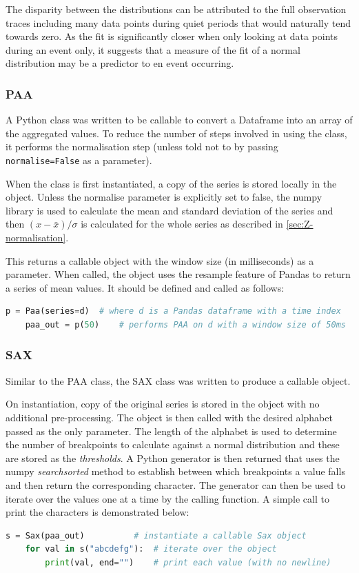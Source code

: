 \documentclass[../report.tex]{subfiles}
\begin{document}
	The disparity between the distributions can be attributed to the full observation traces including many data points during quiet periods that would naturally tend towards zero.  As the fit is significantly closer when only looking at data points during an event only, it suggests that a measure of the fit of a normal distribution may be a predictor to en event occurring.

\subsubsection{PAA}
	A Python class was written to be callable to convert a Dataframe into an array of the aggregated values.  To reduce the number of steps involved in using the class, it performs the normalisation step (unless told not to by passing \verb|normalise=False| as a parameter).
	
	
	
	When the class is first instantiated, a copy of the series is stored locally in the object.  Unless the normalise parameter is explicitly set to false, the numpy library is used to calculate the mean and standard deviation of the series and then $(x - \bar{x}) / \sigma$ is calculated for the whole series as described in \cref{sec:Z-normalisation}.
	
	This returns a callable object with the window size (in milliseconds) as a parameter.  When called, the object uses the resample feature of Pandas to return a series of mean values.	It should be defined and called as follows:
	
\begin{lstlisting}[language=Python]
	p = Paa(series=d)  # where d is a Pandas dataframe with a time index
	paa_out = p(50)    # performs PAA on d with a window size of 50ms
\end{lstlisting}

\subsubsection{SAX}
	Similar to the PAA class, the SAX class was written to produce a callable object.

	
	
	On instantiation, copy of the original series is stored in the object with no additional pre-processing.  The object is then called with the desired alphabet passed as the only parameter.  The length of the alphabet is used to determine the number of breakpoints to calculate against a normal distribution and these are stored as the \textit{thresholds}.  A Python generator is then returned that uses the numpy \textit{searchsorted} method to establish between which breakpoints a value falls and then return the corresponding character.  The generator can then be used to iterate over the values one at a time by the calling function.  A simple call to print the characters is demonstrated below:
	
\begin{lstlisting}[language=Python]
	s = Sax(paa_out)          # instantiate a callable Sax object
	for val in s("abcdefg"):  # iterate over the object
	    print(val, end="")    # print each value (with no newline)
\end{lstlisting}
	
\end{document}
